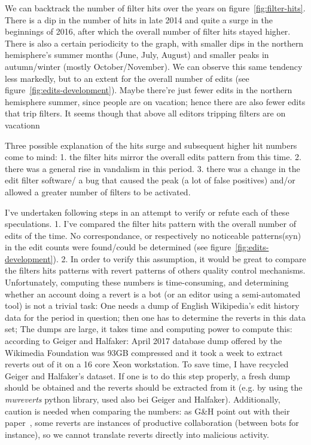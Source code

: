 We can backtrack the number of filter hits over the years on figure~\ref{fig:filter-hits}.
There is a dip in the number of hits in late 2014 and quite a surge in the beginnings of 2016, after which the overall number of filter hits stayed higher.
There is also a certain periodicity to the graph, with smaller dips in the northern hemisphere's summer months (June, July, August) and smaller peaks in autumn/winter (mostly October/November).
We can observe this same tendency less markedly, but to an extent for the overall number of edits (see figure~\ref{fig:edits-development}). %
Maybe there're just fewer edits in the northern hemisphere summer, since people are on vacation; hence there are also fewer edits that trip filters.
It seems though that above all editors tripping filters are on vacation^^.

Three possible explanation of the hits surge and subsequent higher hit numbers come to mind:
1. the filter hits mirror the overall edits pattern from this time.
2. there was a general rise in vandalism in this period.
3. there was a change in the edit filter software/ a bug that caused the peak (a lot of false positives) and/or allowed a greater number of filters to be activated.

I've undertaken following steps in an attempt to verify or refute each of these speculations.
1. I've compared the filter hits pattern with the overall number of edits of the time.
No correspondance, or respectively no noticeable patterns(syn) in the edit counts were found/could be determined (see figure~\ref{fig:edits-development}).
2. In order to verify this assumption, it would be great to compare the filters hits patterns with revert patterns of others quality control mechanisms.
Unfortunately, computing these numbers is time-consuming, and determining whether an account doing a revert is a bot (or an editor using a semi-automated tool) is not a trivial task:
One needs a dump of English Wikipedia's edit history data for the period in question;
then one has to determine the reverts in this data set;
The dumps are large, it takes time and computing power to compute this: according to Geiger and Halfaker: April 2017 database dump offered by the Wikimedia Foundation was 93GB compressed and it took a week to extract reverts out of it on a 16 core Xeon workstation.
To save time, I have recycled Geiger and Halfaker's dataset.
If one is to do this step properly, a fresh dump should be obtained and the reverts should be extracted from it (e.g. by using the \emph{mwreverts} python library, used also bei Geiger and Halfaker).
Additionally, caution is needed when comparing the numbers: as G\&H point out with their paper~\cite{GeiHal2017}, some reverts are instances of productive collaboration (between bots for instance), so we cannot translate reverts directly into malicious activity.

